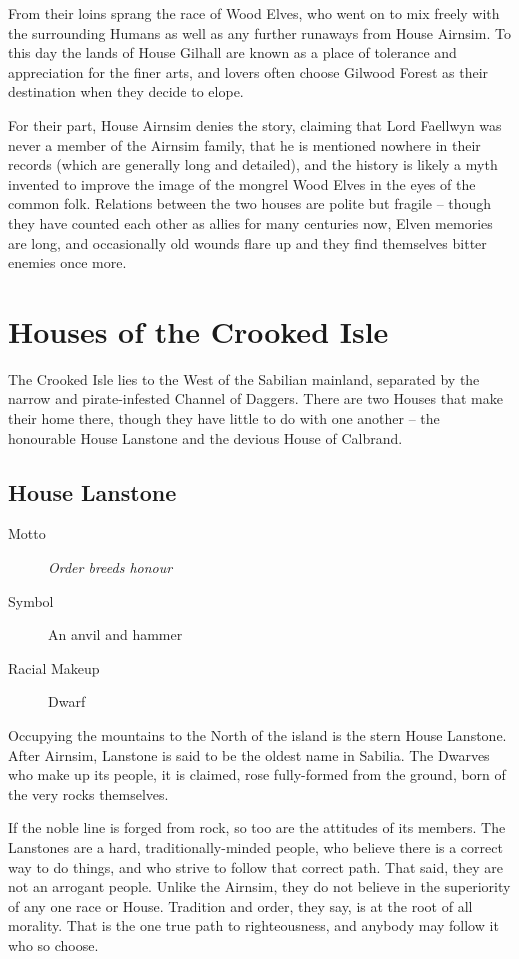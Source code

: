 \documentclass[10pt,twoside,openright,a4paper,twocolumn]{book}
\begin{document}
From their loins sprang the race of Wood Elves, who went on to mix freely with
the surrounding Humans as well as any further runaways from House Airnsim.  To
this day the lands of House Gilhall are known as a place of tolerance and
appreciation for the finer arts, and lovers often choose Gilwood Forest as
their destination when they decide to elope.

For their part, House Airnsim denies the story, claiming that Lord Faellwyn was
never a member of the Airnsim family, that he is mentioned nowhere in their
records (which are generally long and detailed), and the history is likely a
myth invented to improve the image of the mongrel Wood Elves in the eyes of the
common folk.  Relations between the two houses are polite but fragile -- though
they have counted each other as allies for many centuries now, Elven memories
are long, and occasionally old wounds flare up and they find themselves bitter
enemies once more.

\section{Houses of the Crooked Isle}

The Crooked Isle lies to the West of the Sabilian mainland, separated by the
narrow and pirate-infested Channel of Daggers.  There are two Houses that make
their home there, though they have little to do with one another -- the
honourable House Lanstone and the devious House of Calbrand.

\subsection*{House Lanstone}

\begin{description}
\item[Motto] \textit{Order breeds honour}

\item[Symbol] An anvil and hammer

\item[Racial Makeup] Dwarf
\end{description}

\noindent
Occupying the mountains to the North of the island is the stern House Lanstone.
After Airnsim, Lanstone is said to be the oldest name in Sabilia.  The Dwarves
who make up its people, it is claimed, rose fully-formed from the ground, born
of the very rocks themselves.

If the noble line is forged from rock, so too are the attitudes of its members.
The Lanstones are a hard, traditionally-minded people, who believe there is a
correct way to do things, and who strive to follow that correct path.  That
said, they are not an arrogant people. Unlike the Airnsim, they do not believe
in the superiority of any one race or House.  Tradition and order, they say, is
at the root of all morality.  That is the one true path to righteousness, and
anybody may follow it who so choose.
\end{document}
